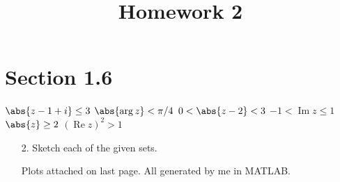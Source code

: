 \documentclass{article}
\DeclareMathOperator{\re}{Re}
\DeclareMathOperator{\im}{Im}
\begin{document}
\title{Homework 2}
\maketitle
\thispagestyle{fancy}

\section*{Section 1.6}

\begin{enumerate}[(a)]
		\ii $\abs{z-1+i}\le 3$
		\ii $\abs{\arg z} < \pi/4$
		\ii $0<\abs{z-2}<3$
		\ii $-1<\im z\le 1$
		\ii $\abs{z}\ge 2$
		\ii $(\re z)^2>1$
\end{enumerate}

\begin{itemize}
	\item[2.] Sketch each of the given sets.
		\begin{answer*}
			Plots attached on last page. All generated by me in MATLAB.
		\end{answer*}


\end{itemize}
\end{document}
